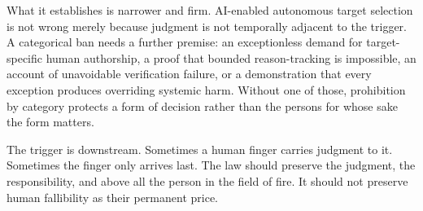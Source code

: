 \documentclass[11pt]{article}
\begin{document}
What it establishes is narrower and firm. AI-enabled autonomous target selection is not wrong merely because judgment is not temporally adjacent to the trigger. A categorical ban needs a further premise: an exceptionless demand for target-specific human authorship, a proof that bounded reason-tracking is impossible, an account of unavoidable verification failure, or a demonstration that every exception produces overriding systemic harm. Without one of those, prohibition by category protects a form of decision rather than the persons for whose sake the form matters.

The trigger is downstream. Sometimes a human finger carries judgment to it. Sometimes the finger only arrives last. The law should preserve the judgment, the responsibility, and above all the person in the field of fire. It should not preserve human fallibility as their permanent price.
\end{document}
